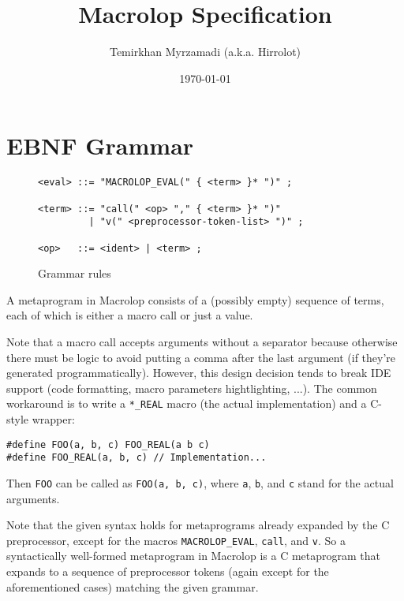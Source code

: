 \documentclass[a4paper, 12pt]{article}
\begin{document}
\title{Macrolop Specification}
\date{\today}
\author{Temirkhan Myrzamadi (a.k.a. Hirrolot)}
\maketitle

\tableofcontents

\newpage

\section{EBNF Grammar}

\begin{figure}[h]
    \caption{Grammar rules}

\begin{verbatim}
<eval> ::= "MACROLOP_EVAL(" { <term> }* ")" ;

<term> ::= "call(" <op> "," { <term> }* ")"
         | "v(" <preprocessor-token-list> ")" ;

<op>   ::= <ident> | <term> ;
\end{verbatim}

\end{figure}

A metaprogram in Macrolop consists of a (possibly empty) sequence of terms, each of which
is either a macro call or just a value.

Note that a macro call accepts arguments without a separator because otherwise there must
be logic to avoid putting a comma after the last argument (if they're generated
programmatically). However, this design decision tends to break IDE support (code
formatting, macro parameters hightlighting, ...). The common workaround is to write a
\texttt{*\_REAL} macro (the actual implementation) and a C-style wrapper:

\begin{verbatim}
#define FOO(a, b, c) FOO_REAL(a b c)
#define FOO_REAL(a, b, c) // Implementation...
\end{verbatim}

Then \texttt{FOO} can be called as \texttt{FOO(a, b, c)}, where \texttt{a}, \texttt{b},
and \texttt{c} stand for the actual arguments.

Note that the given syntax holds for metaprograms already expanded by the C preprocessor,
except for the macros \texttt{MACROLOP\_EVAL}, \texttt{call}, and \texttt{v}. So a
syntactically well-formed metaprogram in Macrolop is a C metaprogram that expands to a
sequence of preprocessor tokens (again except for the aforementioned cases) matching
the given grammar.
\end{document}
